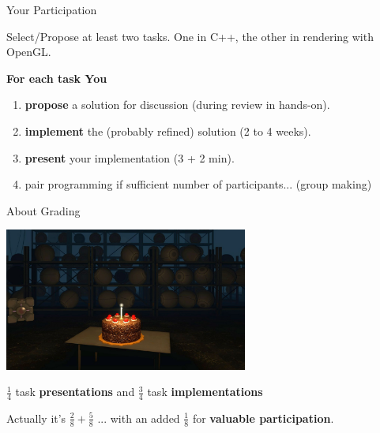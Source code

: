 
\begin{frame}[plain]
\end{frame}


\begin{frame}{Your Participation}

	Select/Propose at least two tasks. One in C++, the other in rendering with OpenGL.
	\bigskip

	\large
	\textbf{For each task You}
	\begin{enumerate}
	
		\item \textbf{propose} a solution for discussion (during review in hands-on).
		\item \textbf{implement} the (probably refined) solution (2 to 4 weeks).
		\item \textbf{present} your implementation (3 + 2 min).
		\bigskip

		\item pair programming if sufficient number of participants... (group making)
		
	\end{enumerate}

\end{frame}


\begin{frame}{About Grading}
	
	\center
	\includegraphics[width=0.6\textwidth]{intro/cake}\medskip

	\LARGE
	$\frac{1}{4}$ task \textbf{presentations} and $\frac{3}{4}$ task \textbf{implementations}	

	\medskip
	\scriptsize
	Actually it's $\frac{2}{8} + \frac{5}{8}$ ... with an added $\frac{1}{8}$ for \textbf{valuable participation}.
	
\end{frame}



